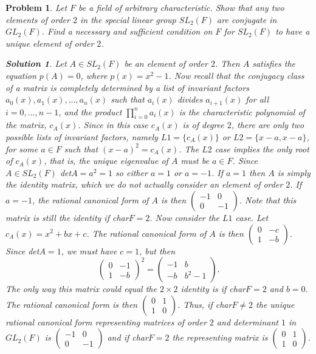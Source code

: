 \documentclass[11pt]{article}
\newcommand{\1}{\textbf{1}}
\newtheorem{prob}{Problem}
\newtheorem*{sol*}{\textit{Solution}}
\begin{document}
\begin{prob}
Let $F$ be a field of arbitrary characteristic. Show that any two elements of order $2$ in the special linear group $SL_2(F)$ are conjugate in $GL_2(F)$. Find a necessary and sufficient condition on $F$ for $SL_2(F)$ to have a unique element of order $2$.

\begin{sol*}
\textnormal{Let $A\in SL_2(F)$ be an element of order $2$. Then $A$ satisfies the equation $p(A) = 0$, where $p(x) = x^2 - 1$. Now recall that the conjugacy class of a matrix is completely determined by a list of invariant factors $a_0(x), a_1(x),...,a_n(x)$ such that $a_i(x)$ divides $a_{i+1}(x)$ for all $i = 0,..., n-1$, and the product $\prod_{i = 0}^n a_i(x)$ is the characteristic polynomial of the matrix, $c_A(x)$. Since in this case $c_A(x)$ is of degree $2$, there are only two possible lists of invariant factors, namely $L1 = \{c_A(x)\}$ or $L2 = \{x - a, x - a\}$, for some $a\in F$ such that $(x-a)^2 = c_A(x)$. The $L2$ case implies the only root of $c_A(x)$, that is, the unique eigenvalue of $A$ must be $a \in F$. Since $A\in SL_2(F)$ det$A = a^2 = 1$ so either $a = 1$ or $a = -1$. If $a = 1$ then $A$ is simply the identity matrix, which we do not actually consider an element of order $2$. If $a = -1$, the rational canonical form of $A$ is then $\begin{pmatrix}-1 & 0 \\ 0 & -1 \end{pmatrix}$. Note that this matrix is still the identity if char$F = 2$. Now consider the $L1$ case. Let $c_A(x) = x^2 + bx + c$. The rational canonical form of $A$ is then $\begin{pmatrix} 0 & -c \\ 1 & -b\end{pmatrix}$. Since det$A = 1$, we must have $c = 1$, but then \[\begin{pmatrix} 0 & -1 \\ 1 & -b\end{pmatrix}^2 = \begin{pmatrix}-1 & b \\ -b & b^2 - 1 \end{pmatrix}.\] The only way this matrix could equal the $2\times 2$ identity is if char$F = 2$ and $b = 0$. The rational canonical form is then $\begin{pmatrix}0 & 1 \\ 1 & 0 \end{pmatrix}$. Thus, if char$F\neq 2$ the unique rational canonical form representing matrices of order $2$ and determinant $1$ in $GL_2(F)$ is $\begin{pmatrix} -1 & 0 \\ 0 & -1\end{pmatrix}$ and if char$F = 2 $ the representing matrix is $\begin{pmatrix} 0 & 1 \\ 1 & 0\end{pmatrix}$.
}


\end{sol*}
\end{prob}
\end{document}
